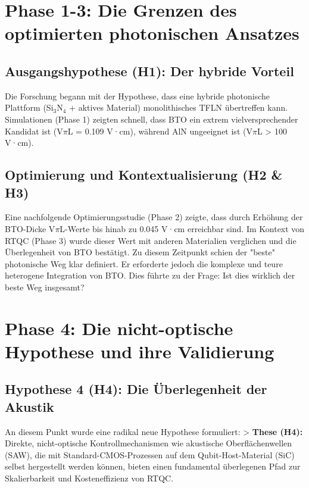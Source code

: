 \documentclass[12pt, a4paper, numbers]{report}
\begin{document}
\chapter{Phase 1-3: Die Grenzen des optimierten photonischen Ansatzes}
\section{Ausgangshypothese (H1): Der hybride Vorteil}
Die Forschung begann mit der Hypothese, dass eine hybride photonische Plattform (Si$_3$N$_4$ + aktives Material) monolithisches TFLN übertreffen kann. Simulationen (Phase 1) zeigten schnell, dass BTO ein extrem vielversprechender Kandidat ist (V$\pi$L = 0.109 V·cm), während AlN ungeeignet ist (V$\pi$L > 100 V·cm).

\section{Optimierung und Kontextualisierung (H2 & H3)}
Eine nachfolgende Optimierungsstudie (Phase 2) zeigte, dass durch Erhöhung der BTO-Dicke V$\pi$L-Werte bis hinab zu 0.045 V·cm erreichbar sind. Im Kontext von RTQC (Phase 3) wurde dieser Wert mit anderen Materialien verglichen und die Überlegenheit von BTO bestätigt. Zu diesem Zeitpunkt schien der "beste" photonische Weg klar definiert. Er erforderte jedoch die komplexe und teure heterogene Integration von BTO. Dies führte zu der Frage: Ist dies wirklich der beste Weg insgesamt?

\chapter{Phase 4: Die nicht-optische Hypothese und ihre Validierung}
\section{Hypothese 4 (H4): Die Überlegenheit der Akustik}
An diesem Punkt wurde eine radikal neue Hypothese formuliert:
> \textbf{These (H4):} Direkte, nicht-optische Kontrollmechanismen wie akustische Oberflächenwellen (SAW), die mit Standard-CMOS-Prozessen auf dem Qubit-Host-Material (SiC) selbst hergestellt werden können, bieten einen fundamental überlegenen Pfad zur Skalierbarkeit und Kosteneffizienz von RTQC.
\end{document}
